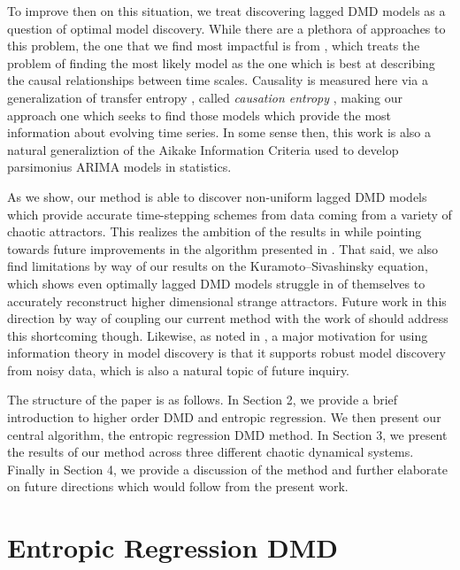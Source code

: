 \documentclass[a4paper,11pt]{article}
\begin{document}
To improve then on this situation, we treat discovering lagged DMD models as a question of optimal model discovery.  While there are a plethora of approaches to this problem, the one that we find most impactful is from \cite{bollt2}, which treats the problem of finding the most likely model as the one which is best at describing the causal relationships between time scales.  Causality is measured here via a generalization of transfer entropy \cite{schreiber}, called {\it causation entropy} \cite{bollt}, making our approach one which seeks to find those models which provide the most information about evolving time series.  In some sense then, this work is also a natural generaliztion of the Aikake Information Criteria \cite{aikake} used to develop parsimonius ARIMA models in statistics.  

As we show, our method is able to discover non-uniform lagged DMD models which provide accurate time-stepping schemes from data coming from a variety of chaotic attractors.  This realizes the ambition of the results in \cite{arbabi} while pointing towards future improvements in the algorithm presented in \cite{curtis_dldmd}.  That said, we also find limitations by way of our results on the Kuramoto--Sivashinsky equation, which shows even optimally lagged DMD models struggle in of themselves to accurately reconstruct higher dimensional strange attractors.  Future work in this direction by way of coupling our current method with the work of \cite{curtis_dldmd} should address this shortcoming though.  Likewise, as noted in \cite{bollt2}, a major motivation for using information theory in model discovery is that it supports robust model discovery from noisy data, which is also a natural topic of future inquiry.  

The structure of the paper is as follows.  In Section 2, we provide a brief introduction to higher order DMD and entropic regression.  We then present our central algorithm, the entropic regression DMD method.  In Section 3, we present the results of our method across three different chaotic dynamical systems.  Finally in Section 4, we provide a discussion of the method and further elaborate on future directions which would follow from the present work.   

\section{Entropic Regression DMD}
\end{document}
